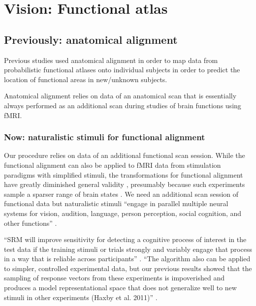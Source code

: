 



\section{Vision: Functional atlas}




\subsection{Previously: anatomical alignment}

%
Previous studies used anatomical alignment in order to map data from
probabilistic functional atlases onto individual subjects in order to predict
the location of functional areas in new/unknown subjects.

%
Anatomical alignment relies on data of an anatomical scan that is essentially
always performed as an additional scan during studies of brain functions using
fMRI.


\subsubsection{Now: naturalistic stimuli for functional alignment}

%
Our procedure relies on data of an additional functional scan session.
%
While the functional alignment can also be applied to fMRI data from
stimulation paradigms with simplified stimuli, the transformations for
functional alignment have greatly diminished general validity
\citep{haxby2011common}, presumably because such experiments sample a sparser
range of brain states \citep{guntupalli2016model}.
%
We need an additional scan session of functional data but naturalistic stimuli
``engage in parallel multiple neural systems for vision, audition, language,
person perception, social cognition, and other functions''
\citep{jiahui2020predicting}.


%
``SRM will improve sensitivity for detecting a cognitive process of interest in
the test data if the training stimuli or trials strongly and variably engage
that process in a way that is reliable across participants''
\citep{cohen2017computational}.
%
``The algorithm also can be applied to simpler, controlled experimental data,
but our previous results showed that the sampling of response vectors from these
experiments is impoverished and produces a model representational space that
does not generalize well to new stimuli in other experiments (Haxby et al.
2011)'' \citep{guntupalli2016model}.

